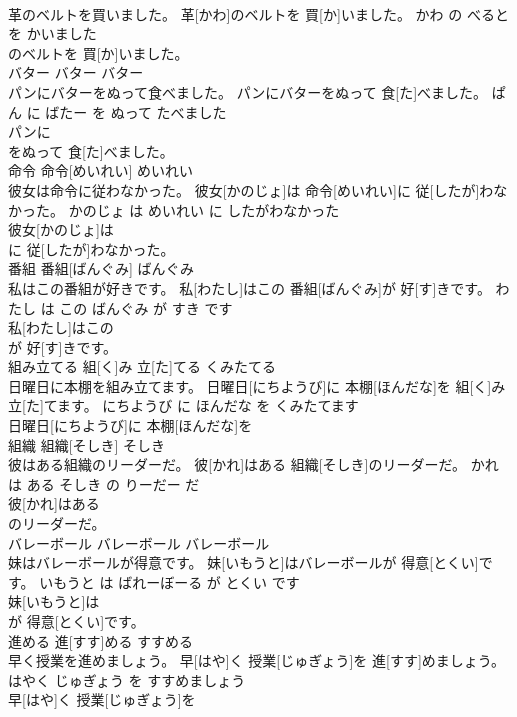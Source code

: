 \documentclass[8pt]{extreport}
\begin{document}
\begin{CJK}{UTF8}{min}
\\	革のベルトを買いました。	革[かわ]のベルトを 買[か]いました。	かわ の べると を かいました	
\\	のベルトを 買[か]いました。			
\\	バター	バター	バター	
\\	パンにバターをぬって食べました。	パンにバターをぬって 食[た]べました。	ぱん に ばたー を ぬって たべました	
\\	パンに
\\	をぬって 食[た]べました。			
\\	命令	命令[めいれい]	めいれい	
\\	彼女は命令に従わなかった。	彼女[かのじょ]は 命令[めいれい]に 従[したが]わなかった。	かのじょ は めいれい に したがわなかった	
\\	彼女[かのじょ]は
\\	に 従[したが]わなかった。			
\\	番組	番組[ばんぐみ]	ばんぐみ	
\\	私はこの番組が好きです。	私[わたし]はこの 番組[ばんぐみ]が 好[す]きです。	わたし は この ばんぐみ が すき です	
\\	私[わたし]はこの
\\	が 好[す]きです。			
\\	組み立てる	組[く]み 立[た]てる	くみたてる	
\\	日曜日に本棚を組み立てます。	日曜日[にちようび]に 本棚[ほんだな]を 組[く]み 立[た]てます。	にちようび に ほんだな を くみたてます	
\\	日曜日[にちようび]に 本棚[ほんだな]を
\\	組織	組織[そしき]	そしき	
\\	彼はある組織のリーダーだ。	彼[かれ]はある 組織[そしき]のリーダーだ。	かれ は ある そしき の りーだー だ	
\\	彼[かれ]はある
\\	のリーダーだ。			
\\	バレーボール	バレーボール	バレーボール	
\\	妹はバレーボールが得意です。	妹[いもうと]はバレーボールが 得意[とくい]です。	いもうと は ばれーぼーる が とくい です	
\\	妹[いもうと]は
\\	が 得意[とくい]です。			
\\	進める	進[すす]める	すすめる	
\\	早く授業を進めましょう。	早[はや]く 授業[じゅぎょう]を 進[すす]めましょう。	はやく じゅぎょう を すすめましょう	
\\	早[はや]く 授業[じゅぎょう]を

\end{CJK}
\end{document}
